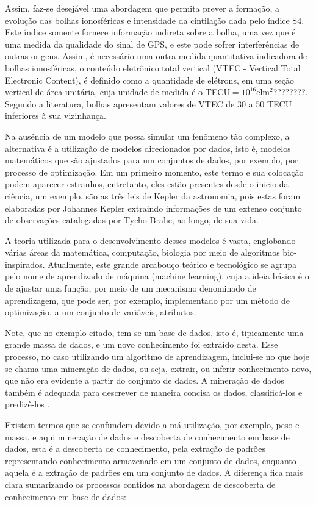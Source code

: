 Assim, faz-se desejável uma abordagem que permita prever a formação, a evolução das bolhas ionosféricas e intensidade da cintilação dada pelo índice S4. Este índice somente fornece informação indireta sobre a bolha, uma vez que é uma medida da qualidade do sinal de GPS, e este pode sofrer interferências de outras origens. Assim, é necessário uma outra medida quantitativa indicadora de bolhas ionosféricas, o conteúdo eletrônico total vertical (VTEC - Vertical Total Electronic Content), é definido como a quantidade de elétrons, em uma seção vertical de área unitária, cuja unidade de medida é o TECU$=10^{16}$elm$^2$????????. Segundo a literatura, bolhas apresentam valores de VTEC de 30 a 50 TECU inferiores à sua vizinhança.

Na ausência de um modelo que possa simular um fenômeno tão complexo, a alternativa é a utilização de modelos direcionados por dados, isto é, modelos matemáticos que são ajustados para um conjuntos de dados, por exemplo, por processo de optimização. Em um primeiro momento, este termo e sua colocação podem aparecer estranhos, entretanto, eles estão presentes desde o inicio da ciência, um exemplo, são as três leis de Kepler da astronomia, pois estas foram elaboradas por Johannes Kepler extraindo informações de um extenso conjunto de observações catalogadas por Tycho Brahe, ao longo, de sua vida. 

A teoria utilizada para o desenvolvimento desses modelos é vasta, englobando várias áreas da matemática, computação, biologia por meio de algoritmos bio-inspirados. Atualmente, este grande arcabouço teórico e tecnológico se agrupa pelo nome de aprendizado de máquina (machine learning), cuja a ideia básica é o de ajustar uma função, por meio de um mecanismo denominado de aprendizagem, que pode ser, por exemplo, implementado por um método de optimização, a um conjunto de variáveis, atributos. 

Note, que no exemplo citado, tem-se um base de dados, isto é, tipicamente uma grande massa de dados, e um novo conhecimento foi extraído desta. Esse processo, no caso utilizando um algoritmo de aprendizagem, inclui-se no que hoje se chama uma mineração de dados, ou seja, extrair, ou inferir conhecimento novo, que não era evidente a partir do conjunto de dados. A mineração de dados também é adequada para descrever de maneira concisa os dados, classificá-los e predizê-los \cite{HAN:2011}. 

Existem termos que se confundem devido a má utilização, por exemplo, peso e massa, e aqui mineração de dados e descoberta de conhecimento em base de dados, esta é a descoberta de conhecimento, pela extração de padrões representando conhecimento armazenado em um conjunto de dados, enquanto aquela é a extração de padrões em um conjunto de dados. A diferença fica mais clara sumarizando os processos contidos na abordagem de descoberta de conhecimento em base de dados:

